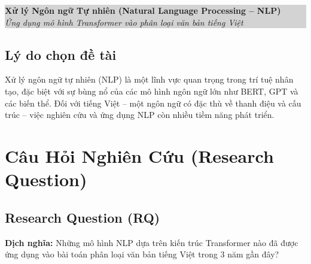 \documentclass[12pt, a4paper]{article}
\begin{document}
\begin{center}
    \colorbox{lightgray}{%
        \parbox{0.9\textwidth}{%
            \centering\vspace{0.3cm}
            {\large\bfseries Xử lý Ngôn ngữ Tự nhiên (Natural Language Processing -- NLP)}\\
            \vspace{0.1cm}
            \textit{Ứng dụng mô hình Transformer vào phân loại văn bản tiếng Việt}
            \vspace{0.3cm}
        }%
    }
\end{center}

\subsection{Lý do chọn đề tài}

Xử lý ngôn ngữ tự nhiên (NLP) là một lĩnh vực quan trọng trong trí tuệ nhân tạo, 
đặc biệt với sự bùng nổ của các mô hình ngôn ngữ lớn như BERT, GPT và các biến thể. 
Đối với tiếng Việt -- một ngôn ngữ có đặc thù về thanh điệu và cấu trúc -- 
việc nghiên cứu và ứng dụng NLP còn nhiều tiềm năng phát triển.

\section{Câu Hỏi Nghiên Cứu (Research Question)}

\subsection{Research Question (RQ)}

\begin{center}
\end{center}

\vspace{0.5cm}
\noindent\textbf{Dịch nghĩa:} Những mô hình NLP dựa trên kiến trúc Transformer nào 
đã được ứng dụng vào bài toán phân loại văn bản tiếng Việt trong 3 năm gần đây?
\end{document}
